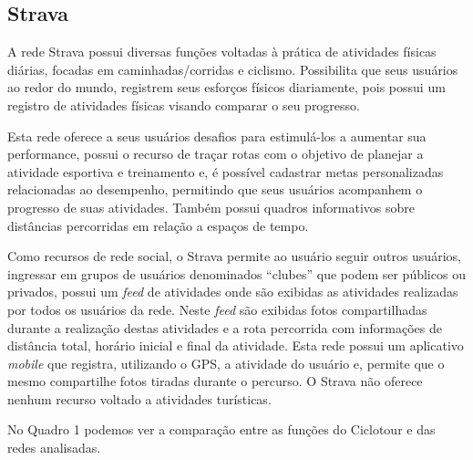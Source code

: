 \subsection{Strava}
A rede Strava \cite{strava} possui diversas funções voltadas à prática de atividades físicas diárias, focadas em caminhadas/corridas e ciclismo. 
Possibilita que seus usuários ao redor do mundo, registrem seus esforços físicos diariamente, pois possui um registro de atividades físicas visando 
comparar o seu progresso. 

Esta rede oferece a seus usuários desafios para estimulá-los a aumentar sua performance, possui o recurso de traçar rotas com o objetivo de planejar 
a atividade esportiva e treinamento e, é possível cadastrar metas personalizadas relacionadas ao desempenho, permitindo que seus usuários 
acompanhem o progresso de suas atividades. Também possui quadros informativos sobre distâncias percorridas em relação a espaços de tempo. 

Como recursos de rede social, o Strava permite ao usuário seguir outros usuários, ingressar em grupos de usuários 
denominados ``clubes'' que podem ser públicos ou privados, possui um \textit{feed} de atividades onde 
são exibidas as atividades realizadas por todos os 
usuários da rede. Neste \textit{feed} são exibidas fotos compartilhadas durante a realização destas atividades e a rota percorrida com informações 
de distância total, horário inicial e final da atividade. Esta rede possui um aplicativo \textit{mobile} que registra, utilizando o GPS, a 
atividade do usuário e, permite que o mesmo compartilhe fotos tiradas durante o percurso. O Strava não oferece nenhum recurso voltado a atividades 
turísticas.

No Quadro 1 podemos ver a comparação entre as funções do Ciclotour e das redes analisadas.

